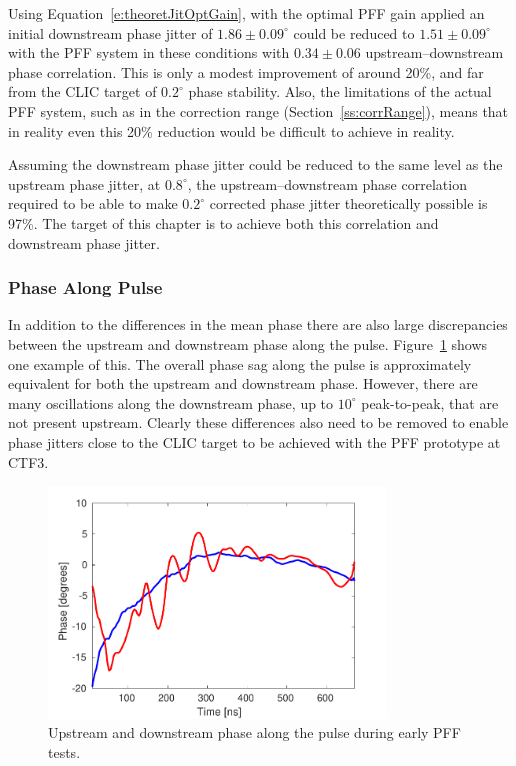 Using Equation~\ref{e:theoretJitOptGain}, with the optimal PFF gain applied an initial downstream phase jitter of \(1.86\pm0.09^\circ\) could be reduced to \(1.51\pm0.09^\circ\) with the PFF system in these conditions with \(0.34\pm0.06\) upstream--downstream phase correlation. This is only a modest improvement of around 20\%, and far from the CLIC target of \(0.2^\circ\) phase stability. Also, the limitations of the actual PFF system, such as in the correction range (Section~\ref{ss:corrRange}), means that in reality even this 20\% reduction would be difficult to achieve in reality.

Assuming the downstream phase jitter could be reduced to the same level as the upstream phase jitter, at \(0.8^\circ\), the upstream--downstream phase correlation required to be able to make \(0.2^\circ\) corrected phase jitter theoretically possible is 97\%. The target of this chapter is to achieve both this correlation and downstream phase jitter.

\subsubsection{Phase Along Pulse}

In addition to the differences in the mean phase there are also large discrepancies between the upstream and downstream phase along the pulse. Figure~\ref{f:origPhaseAlong} shows one example of this. The overall phase sag along the pulse is approximately equivalent for both the upstream and downstream phase. However, there are many oscillations along the downstream phase, up to \(10^\circ\) peak-to-peak, that are not present upstream. Clearly these differences also need to be removed to enable phase jitters close to the CLIC target to be achieved with the PFF prototype at CTF3. 

\begin{figure}
  \centering
  \includegraphics[width=0.8\textwidth]{Figures/propagation/origPhaseAlong}
  \caption{Upstream and downstream phase along the pulse during early PFF tests.}
  \label{f:origPhaseAlong}
\end{figure}

